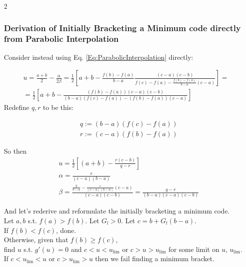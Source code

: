 \documentclass[10pt]{amsart}
\begin{document}
\begin{multicols*}{2}
\subsubsection{Derivation of Initially Bracketing a Minimum code directly from Parabolic Interpolation}

Consider instead using Eq. \ref{Eq:ParabolicInterpolation} directly:

\begin{equation}\label{Eq:ParabolicInterpolationFit}
\begin{gathered}
u = \frac{a+b}{2} - \frac{\alpha}{2\beta} = \frac{1}{2} \left[ a + b - \frac{f(b) - f(a) }{b-a} \frac{ (c-a)(c-b)}{ f(c) - f(a) - \frac{f(b) - f(a)}{b-a} (c-a) } \right] = \\
= \frac{1}{2} \left[ a+b - \frac{ (f(b) -f(a)) (c-a)(c-b) }{ (b-a)(f(c) - f(a)) - (f(b) - f(a))(c- a) } \right]
\end{gathered}
\end{equation}
Redefine $q,r$ to be this:

\begin{align}
& q := (b-a)(f(c) - f(a)) \\
& r:= (c-a) (f(b)-f(a))
\end{align}

So then
\begin{align}
& u = \frac{1}{2} \left[ (a+b) - \frac{r(c-b)}{q- r} \right] \\
& \alpha = \frac{r}{(c-a)(b-a)} \\
& \beta = \frac{ \frac{q}{b-a} - \frac{r}{ (c-a) (b-a) } (c-a) }{ (c-a) (c-b) } = \frac{ q- r}{ (b-a) (c-a) (c-b) }
\end{align}

And let's rederive and reformulate the initially bracketing a minimum code. \\

Let $a,b$ s.t. $f(a) > f(b)$. Let $G_l > 0$. Let $c= b+ G_l(b-a)$.  \\

If $f(b) < f(c)$, done. \\

Otherwise, given that $f(b) \geq f(c)$, \\

find $u$ s.t. $g'(u) = 0$ and $c<u < u_{\lim}$ or $c> u > u_{\lim}$ for some limit on $u$, $u_{\lim}$. \\

If $c< u_{\lim} < u$ or $c> u_{\lim} > u$ then we fail finding a minimum bracket.


\end{multicols*}
\end{document}
